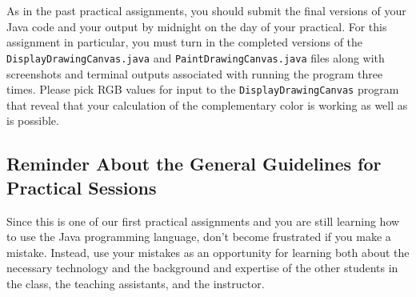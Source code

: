 As in the past practical assignments, you should submit the final versions of your Java code and your output by midnight
on the day of your practical. For this assignment in particular, you must turn in the completed versions of the {\tt
DisplayDrawingCanvas.java} and {\tt PaintDrawingCanvas.java} files along with screenshots and terminal outputs
associated with running the program three times. Please pick RGB values for input to the {\tt DisplayDrawingCanvas}
program that reveal that your calculation of the complementary color is working as well as is possible.

\vspace*{-.2in}
\subsection*{Reminder About the General Guidelines for Practical Sessions}

Since this is one of our first practical assignments and you are still learning how to use the Java programming
language, don't become frustrated if you make a mistake. Instead, use your mistakes as an opportunity for learning both
about the necessary technology and the background and expertise of the other students in the class, the teaching
assistants, and the instructor.

